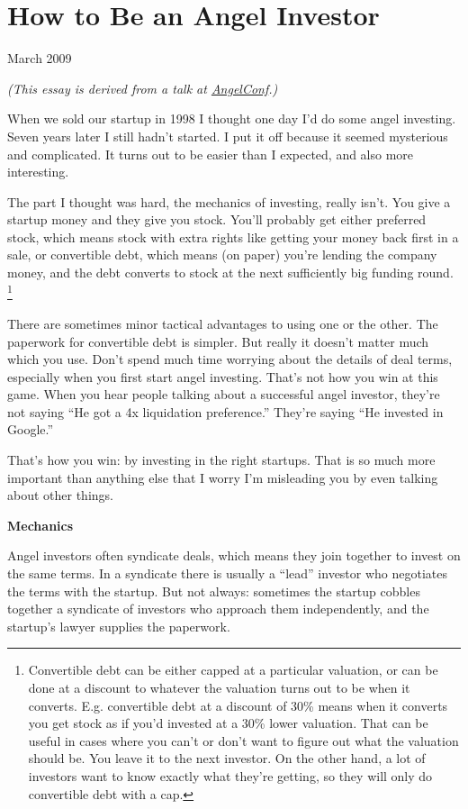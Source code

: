 \chapter{How to Be an Angel Investor}

March 2009

\emph{(This essay is derived from a talk at
\href{http://angelconf.org}{AngelConf}.)}

When we sold our startup in 1998 I thought one day I'd do some angel
investing. Seven years later I still hadn't started. I put it off
because it seemed mysterious and complicated. It turns out to be easier
than I expected, and also more interesting.

The part I thought was hard, the mechanics of investing, really isn't.
You give a startup money and they give you stock. You'll probably get
either preferred stock, which means stock with extra rights like getting
your money back first in a sale, or convertible debt, which means (on
paper) you're lending the company money, and the debt converts to stock
at the next sufficiently big funding round. \footnote{Convertible debt can be either capped at a particular valuation,
or can be done at a discount to whatever the valuation turns out to be
when it converts. E.g. convertible debt at a discount of 30\% means when
it converts you get stock as if you'd invested at a 30\% lower
valuation. That can be useful in cases where you can't or don't want to
figure out what the valuation should be. You leave it to the next
investor. On the other hand, a lot of investors want to know exactly
what they're getting, so they will only do convertible debt with a cap.}

There are sometimes minor tactical advantages to using one or the other.
The paperwork for convertible debt is simpler. But really it doesn't
matter much which you use. Don't spend much time worrying about the
details of deal terms, especially when you first start angel investing.
That's not how you win at this game. When you hear people talking about
a successful angel investor, they're not saying ``He got a 4x
liquidation preference.'' They're saying ``He invested in Google.''

That's how you win: by investing in the right startups. That is so much
more important than anything else that I worry I'm misleading you by
even talking about other things.

\textbf{Mechanics}

Angel investors often syndicate deals, which means they join together to
invest on the same terms. In a syndicate there is usually a ``lead''
investor who negotiates the terms with the startup. But not always:
sometimes the startup cobbles together a syndicate of investors who
approach them independently, and the startup's lawyer supplies the
paperwork.

